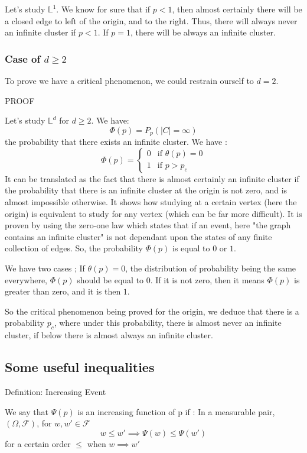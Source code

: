 \documentclass{article}
\begin{document}
Let's study $\mathbb{L}^1$. We know for sure that if $p < 1$, then almost certainly there will be a closed edge to left of the origin, and to the right. Thus, there will always never an infinite cluster if $p < 1$. If $p = 1$, there will be always an infinite cluster.

\subsubsection{Case of $d \geq 2$}

To prove we have a critical phenomenon, we could restrain ourself to $d = 2$.

PROOF

Let's study $\mathbb{L}^d$ for $d \geq 2$.
We have:
$$\Phi(p)=P_p(|C|=\infty)$$
the probability that there exists an infinite cluster. We have :
$$
\Phi(p) = \left\{
    \begin{array}{ll}
        0 & \mbox{if $\theta(p)=0$}\\
        1 & \mbox{if $p > p_c$}
    \end{array}
\right.
$$
It can be translated as the fact that there is almost certainly an infinite cluster if the probability that there is an infinite cluster at the origin is not zero, and is almost impossible otherwise. It shows how studying at a certain vertex (here the origin) is equivalent to study for any vertex (which can be far more difficult). It is proven by using the zero-one law which states that if an event, here "the graph contains an infinite cluster" is not dependant upon the states of any finite collection of edges. So, the probability $\Phi(p)$ is equal to $0$ or $1$.

We have two cases ;
If $\theta(p)=0$, the distribution of probability being the same everywhere, $\Phi(p)$ should be equal to $0$.
If it is not zero, then it means $\Phi(p)$ is greater than zero, and it is then $1$.

So the critical phenomenon being proved for the origin, we deduce that there is a probability $p_c$, where under this probability, there is almost never an infinite cluster, if below there is almost always an infinite cluster.

\subsection{Some useful inequalities}

Definition: Increasing Event

We say that $\Psi(p)$ is an increasing function of p if :
In a measurable pair, $(\Omega, \mathscr{F})$, for $w, w' \in \mathscr{F}$
$$w \leq w' \implies \Psi(w) \leq \Psi(w')$$
for a certain order $\leq$ when $w \implies w'$
\end{document}
